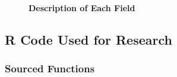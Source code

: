 \documentclass[]{article}
\begin{document}
\begin{figure}[!ht]
    \caption{ \textbf{Description of Each Field} }
    \begin{center}
    \end{center}
    \label{fig:datasets_explained}
\end{figure}

\newpage

\subsection{R Code Used for Research}
\label{sec:r-setup}

\subsubsection{Sourced Functions}
\label{sec:functions}
\end{document}
